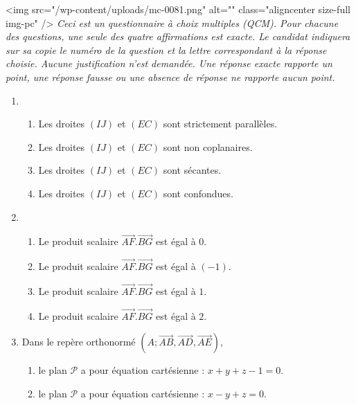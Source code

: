 \begin{center}
\end{center}
<img src="/wp-content/uploads/mc-0081.png" alt="" class="aligncenter size-full  img-pc" />
\textit{Ceci est un questionnaire à choix multiples (QCM). Pour chacune des questions, une seule des quatre affirmations est exacte. Le candidat indiquera sur sa copie le numéro de la question et la lettre correspondant à la réponse choisie. Aucune justification n'est demandée. Une réponse exacte rapporte un point, une réponse fausse ou une absence de réponse ne rapporte aucun point.}
\begin{enumerate}
     \item
     \begin{enumerate}
          \item
          Les droites $\left(IJ\right)$ et $\left(EC\right)$ sont strictement parallèles.
          \item
          Les droites $\left(IJ\right)$ et $\left(EC\right)$ sont non coplanaires.
          \item
          Les droites $\left(IJ\right)$ et $\left(EC\right)$ sont sécantes.
          \item
     Les droites $\left(IJ\right)$ et $\left(EC\right)$ sont confondues.\end{enumerate}
     \item
     \begin{enumerate}
          \item
          Le produit scalaire $\overrightarrow{AF}.\overrightarrow{BG}$ est égal à $0$.
          \item
          Le produit scalaire $\overrightarrow{AF}.\overrightarrow{BG}$ est égal à $\left(-1\right)$.
          \item
          Le produit scalaire $\overrightarrow{AF}.\overrightarrow{BG}$ est égal à $1$.
          \item
     Le produit scalaire $\overrightarrow{AF}.\overrightarrow{BG}$ est égal à $2$.\end{enumerate}
     \item
     Dans le repère orthonormé $\left(A ;  \overrightarrow{AB}, \overrightarrow{AD}, \overrightarrow{AE}\right)$,
     \begin{enumerate}
          \item
          le plan $\mathscr P$ a pour équation cartésienne : $x+y+z-1=0$.
          \item
          le plan $\mathscr P$ a pour équation cartésienne : $x-y+z=0$.

\end{enumerate}
\end{enumerate}
